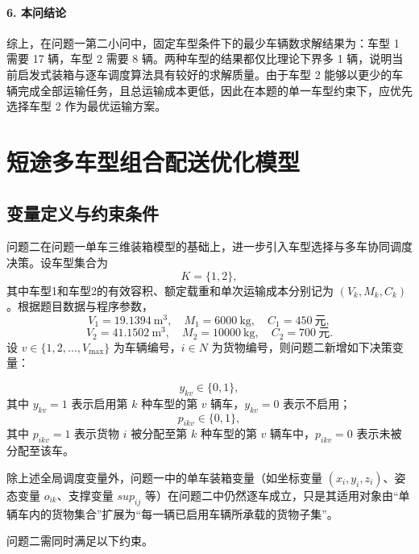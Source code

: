 \documentclass{MMCStyle}
\begin{document}
\paragraph{6. 本问结论}
综上，在问题一第二小问中，固定车型条件下的最少车辆数求解结果为：车型 1 需要 17 辆，车型 2 需要 8 辆。两种车型的结果都仅比理论下界多 1 辆，说明当前启发式装箱与逐车调度算法具有较好的求解质量。由于车型 2 能够以更少的车辆完成全部运输任务，且总运输成本更低，因此在本题的单一车型约束下，应优先选择车型 2 作为最优运输方案。

\section{短途多车型组合配送优化模型}

\subsection{变量定义与约束条件}

问题二在问题一单车三维装箱模型的基础上，进一步引入车型选择与多车协同调度决策。设车型集合为
\begin{equation}
K=\{1,2\},
\end{equation}
其中车型1和车型2的有效容积、额定载重和单次运输成本分别记为 $(V_k,M_k,C_k)$。根据题目数据与程序参数，
\begin{equation}
V_1=19.1394\ \mathrm{m^3},\quad M_1=6000\ \mathrm{kg},\quad C_1=450\ \mathrm{元},
\end{equation}
\begin{equation}
V_2=41.1502\ \mathrm{m^3},\quad M_2=10000\ \mathrm{kg},\quad C_2=700\ \mathrm{元}.
\end{equation}
设 $v\in\{1,2,\dots,V_{\max}\}$ 为车辆编号，$i\in N$ 为货物编号，则问题二新增如下决策变量：

\begin{equation}
y_{kv}\in\{0,1\},
\end{equation}
其中 $y_{kv}=1$ 表示启用第 $k$ 种车型的第 $v$ 辆车，$y_{kv}=0$ 表示不启用；
\begin{equation}
p_{ikv}\in\{0,1\},
\end{equation}
其中 $p_{ikv}=1$ 表示货物 $i$ 被分配至第 $k$ 种车型的第 $v$ 辆车中，$p_{ikv}=0$ 表示未被分配至该车。

除上述全局调度变量外，问题一中的单车装箱变量（如坐标变量 $(x_i,y_i,z_i)$、姿态变量 $o_{ik}$、支撑变量 $sup_{ij}$ 等）在问题二中仍然逐车成立，只是其适用对象由“单辆车内的货物集合”扩展为“每一辆已启用车辆所承载的货物子集”。

问题二需同时满足以下约束。
\end{document}
